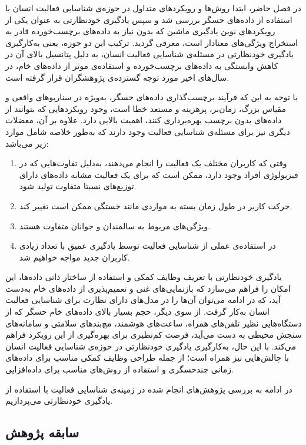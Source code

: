 در فصل حاضر، ابتدا روش‌ها و رویکردهای متداول در حوزه‌ی شناسایی فعالیت انسان با استفاده از داده‌های حسگر بررسی شد و سپس یادگیری خودنظارتی به عنوان یکی از رویکردهای نوین یادگیری ماشین که بدون نیاز به داده‌های برچسب‌خورده قادر به استخراج ویژگی‌های معنادار است، معرفی گردید. ترکیب این دو حوزه، یعنی به‌کارگیری یادگیری خودنظارتی در مسئله‌ی شناسایی فعالیت انسان، به دلیل پتانسیل بالای آن در کاهش وابستگی به داده‌های برچسب‌خورده و استفاده‌ی موثر از داده‌های خام، در سال‌های اخیر مورد توجه گسترده‌ی پژوهشگران قرار گرفته است.

با توجه به این که فرآیند برچسب‌گذاری داده‌های حسگر، به‌ویژه در سناریوهای واقعی و مقیاس بزرگ، زمان‌بر، پرهزینه و مستعد خطا است، وجود رویکردهایی که بتوانند از داده‌های بدون برچسب بهره‌برداری کنند، اهمیت بالایی دارد. علاوه بر آن، معضلات دیگری نیز برای مسئله‌ی شناسایی فعالیت وجود دارند که به‌طور خلاصه شامل موارد زیر می‌باشد:
\begin{enumerate}
    \item وقتی که کاربران مختلف یک فعالیت را انجام می‌دهند، به‌دلیل تفاوت‌هایی که در فیزیولوژی افراد وجود دارد، ممکن است که برای یک فعالیت مشابه داده‌های دارای توزیع‌های نسبتا متفاوت تولید شود.
    \item حرکت کاربر در طول زمان بسته به مواردی مانند خستگی ممکن است تغییر کند.
    \item ویژگی‌های مربوط به سالمندان و جوانان متفاوت هستند.
    \item در استفاده‌ی عملی از شناسایی فعالیت توسط یادگیری عمیق با تعداد زیادی کاربران جدید مواجه خواهیم شد.
\end{enumerate}
یادگیری خودنظارتی با تعریف وظایف کمکی و استفاده از ساختار ذاتی داده‌ها، این امکان را فراهم می‌سازد که بازنمایی‌های غنی و تعمیم‌پذیری از داده‌های خام به‌دست آید، که در ادامه می‌توان آن‌ها را در مدل‌های دارای نظارت برای شناسایی فعالیت انسان به‌کار گرفت. از سوی دیگر، حجم بسیار بالای داده‌های خام حسگر که از دستگاه‌هایی نظیر تلفن‌های همراه، ساعت‌های هوشمند، مچ‌بندهای سلامتی و سامانه‌های سنجش محیطی به دست می‌آید، فرصت کم‌نظیری برای بهره‌گیری از این رویکرد فراهم می‌کند. با این حال، به‌کارگیری یادگیری خودنظارتی در حوزه‌ی شناسایی فعالیت انسان با چالش‌هایی نیز همراه است؛ از جمله طراحی وظایف کمکی مناسب برای داده‌های زمانی چندحسگری و استفاده از روش‌های مناسب برای داده‌افزایی.

در ادامه به بررسی پژوهش‌های انجام شده در زمینه‌ی شناسایی فعالیت با استفاده از یادگیری خودنظارتی می‌پردازیم.

\subsection{سابقه پژوهش}

